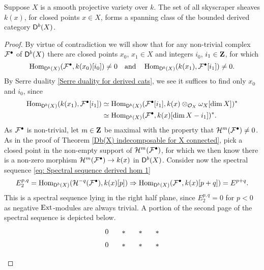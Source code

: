 \begin{proposition}
    \label{k(x) spanning class}
    Suppose $X$ is a smooth projective variety over $k$. The set of all skyscraper sheaves $k(x)$, for closed points $x \in X$, forms a spanning class of the bounded derived category $\mathsf{D}^b(X)$.
\end{proposition}

\begin{proof}
    By virtue of contradiction we will show that for any non-trivial complex $\mathcal F^\bullet$ of $\mathsf{D}^b(X)$ there are closed points $x_0$, $x_1 \in X$ and integers $i_0$, $i_1 \in \mathbf Z$, for which
    \[
        \operatorname{Hom}_{\mathsf{D}^b(X)}(\mathcal F^\bullet, k(x_0)[i_0]) \neq 0 \quad \text{and} \quad \operatorname{Hom}_{\mathsf{D}^b(X)}(k(x_1), \mathcal F^\bullet[i_1]) \neq 0.
    \] 
    By Serre duality \ref{Serre duality for derived cats}, we see it suffices to find only $x_0$ and $i_0$, since
    \begin{align*}
        \operatorname{Hom}_{\mathsf{D}^b(X)}(k(x_1), \mathcal F^\bullet[i_1]) 
        &\simeq \operatorname{Hom}_{\mathsf{D}^b(X)}(\mathcal F^\bullet[i_1], k(x) \otimes_{{\mathcal{O}_{X}}} \omega_X[\dim X])^* \\
        &\simeq \operatorname{Hom}_{\mathsf{D}^b(X)}(\mathcal F^\bullet, k(x)[\dim X - i_1])^*. 
    \end{align*}
    As $\mathcal F^\bullet$ is non-trivial, let $m \in \mathbf Z$ be maximal with the property that $\mathcal{H}^m(\mathcal F^\bullet) \neq 0$. As in the proof of Theorem \ref{Db(X) indecomposable for X connected}, pick a closed point in the non-empty support of $\mathcal H^m(\mathcal F^\bullet)$, for which we then know there is a non-zero morphism $\mathcal H^m(\mathcal F^\bullet) \to k(x)$ in $\mathsf{D}^b(X)$. Consider now the spectral sequence \eqref{eq: Spectral sequence derived hom 1}
    \[
        E^{p,q}_2 = \operatorname{Hom}_{\mathsf{D}^b(X)}(\mathcal H^{-q}(\mathcal F^\bullet), k(x)[p]) \Rightarrow \operatorname{Hom}_{\mathsf{D}^b(X)}(\mathcal F^\bullet, k(x)[p+q]) = E^{p+q}.  
    \] 
    This is a spectral sequence lying in the right half plane, since $E^{p,q}_2 = 0$ for $p < 0$ as negative $\operatorname{Ext}$-modules are always trivial. A portion of the second page of the spectral sequence is depicted below.
    \[\begin{tikzcd}[column sep = 1em, row sep = 0.5em]
        0 & {*} & {*} & {*} \\
        0 & {*} & {*} & {*} \\

\end{tikzcd}\]
\end{proof}
